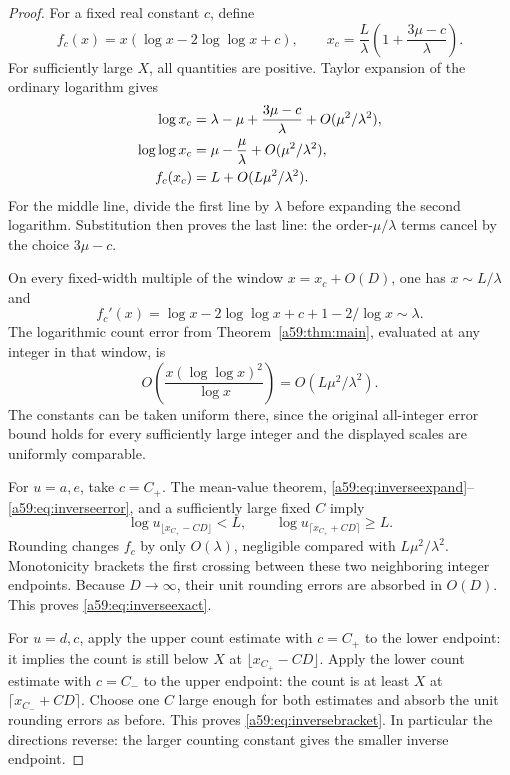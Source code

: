 \documentclass[11pt,letterpaper]{article}
\theoremstyle{remark}\newtheorem{remark}[theorem]{Remark}
\theoremstyle{remark}\newtheorem{wremark}{Remark}\renewcommand{\thewremark}{W\arabic{wremark}}
\theoremstyle{plain}\newtheorem{wcorollary}[wremark]{Corollary}
\begin{document}
\begin{proof}
For a fixed real constant $c$, define
\[
 f_c(x)=x(\log x-2\log\log x+c),\qquad
 x_c=\frac L\lambda\left(1+\frac{3\mu-c}{\lambda}\right).
\]
For sufficiently large $X$, all quantities are positive. Taylor expansion of the ordinary logarithm gives
\begin{align}
 \log x_c&=\lambda-\mu+\frac{3\mu-c}{\lambda}
                +O(\mu^2/\lambda^2),\notag\\
 \log\log x_c&=\mu-\frac\mu\lambda+O(\mu^2/\lambda^2),\notag\\
 f_c(x_c)&=L+O(L\mu^2/\lambda^2).\label{a59:eq:inverseexpand}
\end{align}
For the middle line, divide the first line by $\lambda$ before expanding the second logarithm. Substitution then proves the last line: the order-$\mu/\lambda$ terms cancel by the choice $3\mu-c$.

On every fixed-width multiple of the window $x=x_c+O(D)$, one has $x\sim L/\lambda$ and
\begin{equation}\label{a59:eq:slope}
 f_c'(x)=\log x-2\log\log x+c+1-2/\log x\sim\lambda.
\end{equation}
The logarithmic count error from Theorem~\ref{a59:thm:main}, evaluated at any integer in that window, is
\begin{equation}\label{a59:eq:inverseerror}
 O\!\left(\frac{x(\log\log x)^2}{\log x}\right)
       =O(L\mu^2/\lambda^2).
\end{equation}
The constants can be taken uniform there, since the original all-integer error bound holds for every sufficiently large integer and the displayed scales are uniformly comparable.

For $u=a,e$, take $c=C_+$. The mean-value theorem, \eqref{a59:eq:inverseexpand}--\eqref{a59:eq:inverseerror}, and a sufficiently large fixed $C$ imply
\[
 \log u_{\lfloor x_{C_+}-CD\rfloor}<L,
 \qquad
 \log u_{\lceil x_{C_+}+CD\rceil}\ge L.
\]
Rounding changes $f_c$ by only $O(\lambda)$, negligible compared with $L\mu^2/\lambda^2$. Monotonicity brackets the first crossing between these two neighboring integer endpoints. Because $D\to\infty$, their unit rounding errors are absorbed in $O(D)$. This proves \eqref{a59:eq:inverseexact}.

For $u=d,c$, apply the upper count estimate with $c=C_+$ to the lower endpoint: it implies the count is still below $X$ at $\lfloor x_{C_+}-CD\rfloor$. Apply the lower count estimate with $c=C_-$ to the upper endpoint: the count is at least $X$ at $\lceil x_{C_-}+CD\rceil$. Choose one $C$ large enough for both estimates and absorb the unit rounding errors as before. This proves \eqref{a59:eq:inversebracket}. In particular the directions reverse: the larger counting constant gives the smaller inverse endpoint.
\end{proof}
\end{document}
